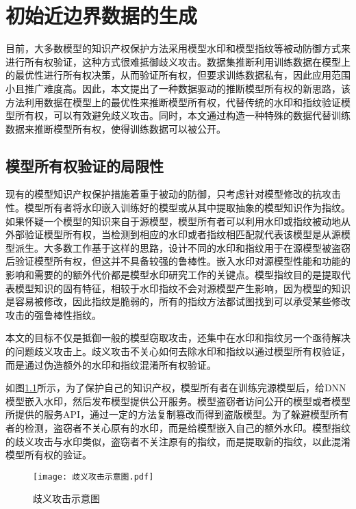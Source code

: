
\chapter{初始近边界数据的生成}\label{3}

目前，大多数模型的知识产权保护方法采用模型水印和模型指纹等被动防御方式来进行所有权验证，这种方式很难抵御歧义攻击。数据集推断利用训练数据在模型上的最优性进行所有权决策，从而验证所有权，但要求训练数据私有，因此应用范围小且推广难度高。因此，本文提出了一种数据驱动的推断模型所有权的新思路，该方法利用数据在模型上的最优性来推断模型所有权，代替传统的水印和指纹验证模型所有权，可以有效避免歧义攻击。同时，本文通过构造一种特殊的数据代替训练数据来推断模型所有权，使得训练数据可以被公开。

\section{模型所有权验证的局限性}\label{3.1}

现有的模型知识产权保护措施着重于被动的防御，只考虑针对模型修改的抗攻击性。模型所有者将水印嵌入训练好的模型或从其中提取抽象的模型知识作为指纹。如果怀疑一个模型的知识来自于源模型，模型所有者可以利用水印或指纹被动地从外部验证模型所有权，当检测到相应的水印或者指纹相匹配就代表该模型是从源模型派生。大多数工作基于这样的思路，设计不同的水印和指纹用于在源模型被盗窃后验证模型所有权，但这并不具备较强的鲁棒性。嵌入水印对源模型性能和功能的影响和需要的的额外代价都是模型水印研究工作的关键点。模型指纹目的是提取代表模型知识的固有特征，相较于水印指纹不会对源模型产生影响，因为模型的知识是容易被修改，因此指纹是脆弱的，所有的指纹方法都试图找到可以承受某些修改攻击的强鲁棒性指纹。

本文的目标不仅是抵御一般的模型窃取攻击，还集中在水印和指纹另一个亟待解决的问题歧义攻击上。歧义攻击不关心如何去除水印和指纹以通过模型所有权验证，而是通过伪造额外的水印和指纹混淆所有权验证。

如图\ref{歧义攻击示意图}所示，为了保护自己的知识产权，模型所有者在训练完源模型后，给DNN模型嵌入水印，然后发布模型提供公开服务。模型盗窃者访问公开的模型或者模型所提供的服务API，通过一定的方法复制篡改而得到盗版模型。为了躲避模型所有者的检测，盗窃者不关心原有的水印，而是给模型嵌入自己的额外水印。模型指纹的歧义攻击与水印类似，盗窃者不关注原有的指纹，而是提取新的指纹，以此混淆模型所有权的验证。

\begin{figure}[htb]%
	\centering
	\vspace{-2mm}
	\setlength{\belowcaptionskip}{-3mm} %
	\texttt{[image: 歧义攻击示意图.pdf]}
	\caption{歧义攻击示意图}
	\label{歧义攻击示意图}
\end {figure}	

